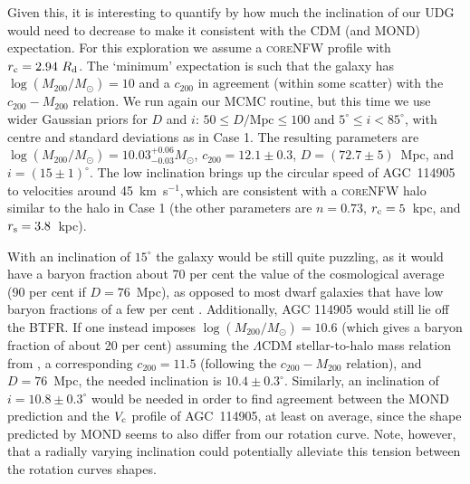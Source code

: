 \documentclass[fleqn,usenatbib]{mnras}
\begin{document}
Given this, it is interesting to quantify by how much the inclination of our UDG would need to decrease to make it consistent with the CDM (and MOND) expectation. For this exploration we assume a \textsc{core}NFW profile with $r_{\rm c} = 2.94~R_{\rm d}$. The `minimum' expectation is such that the galaxy has $\log(M_{200}/M_\odot) = 10$ and a $c_{200}$ in agreement (within some scatter) with the $c_{200}-M_{200}$ relation. We run again our MCMC routine, but this time we use wider Gaussian priors for $D$ and $i$: $50 \leq D/\textrm{Mpc} \leq 100$ and $5^\circ \leq i < 85^\circ$, with centre and standard deviations as in Case 1. The resulting parameters are $\log(M_{200}/M_\odot) = 10.03^{+0.06}_{-0.03} M_\odot$, $c_{200} = 12.1 \pm 0.3$, $D = (72.7 \pm 5)$~Mpc, and $i = (15\pm 1)^\circ$. The low inclination brings up the circular speed of AGC~114905 to velocities around 45~km~s$^{-1}, $which are consistent with a \textsc{core}NFW halo similar to the halo in Case 1 (the other parameters are $n=0.73$, $r_{\rm c} = 5$~kpc, and $r_{\rm s} = 3.8$~kpc).


With an inclination of $15^\circ$ the galaxy would be still quite puzzling, as it would have a baryon fraction about 70 per cent the value of the cosmological average (90 per cent if $D = 76$~Mpc), as opposed to most dwarf galaxies that have low baryon fractions of a few per cent \citep{mcgaugh_baryonfraction,read2017}. Additionally, AGC 114905 would still lie off the BTFR. If one instead imposes $\log(M_{200}/M_\odot) = 10.6$ (which gives a baryon fraction of about 20 per cent) assuming the $\Lambda$CDM stellar-to-halo mass relation from \citet{posti_galaxyhalo}, a corresponding $c_{200} = 11.5$ (following the $c_{200}-M_{200}$ relation), and $D = 76$~Mpc, the needed inclination is $10.4 \pm 0.3^\circ$. Similarly, an inclination of $i = 10.8 \pm 0.3^\circ$ would be needed in order to find agreement between the MOND prediction and the $V_{\rm c}$ profile of AGC~114905, at least on average, since the shape predicted by MOND seems to also differ from our rotation curve. Note, however, that a radially varying inclination could potentially alleviate this tension between the rotation curves shapes. 
\end{document}
